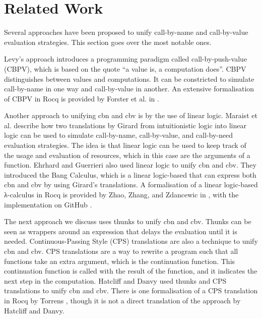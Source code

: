 \chapter{Related Work}\label{relatedwork}

Several approaches have been proposed to unify call-by-name and call-by-value evaluation strategies.
This section goes over the most notable ones.

Levy's approach \cite{levy2001thesis} introduces a programming paradigm called call-by-push-value (CBPV),
which is based on the quote ``a value is, a computation does''.
CBPV distinguishes between values and computations.
It can be constricted to simulate call-by-name in one way and call-by-value in another.
An extensive formalisation of CBPV in Rocq is provided by Forster et al. in \cite{ForsterSSS19}. 

Another approach to unifying \textsf{cbn} and \textsf{cbv} is by the use of linear logic. 
Maraist et al. \cite{MARAIST1999175} describe how two translations by Girard from intuitionistic logic into linear logic can be used to simulate call-by-name, call-by-value, and call-by-need evaluation strategies.
The idea is that linear logic can be used to keep track of the usage and evaluation of resources, which in this case are the arguments of a function.
Ehrhard and Guerrieri \cite{EhrhardGuerrieri2016} also used linear logic to unify \textsf{cbn} and \textsf{cbv}.
They introduced the Bang Calculus, which is a linear logic-based \lc that can express both \textsf{cbn} and \textsf{cbv} by using Girard's translations.
A formalisation of a linear logic-based λ-calculus in Rocq is provided by Zhao, Zhang, and Zdancewic in \cite{ZhaoZhangZdancewic2010},
with the implementation on GitHub \cite{ZdancewicLinearityRepo}.

The next approach we discuss uses thunks to unify \textsf{cbn} and \textsf{cbv}.
Thunks can be seen as wrappers around an expression that delays the evaluation until it is needed.
Continuous-Passing Style (CPS) translations are also a technique to unify \textsf{cbn} and \textsf{cbv}.
CPS translations are a way to rewrite a program such that all functions take an extra argument, which is the continuation function.
This continuation function is called with the result of the function, and it indicates the next step in the computation.
Hatcliff and Danvy \cite{HATCLIFF_DANVY_1997} used thunks and CPS translations to unify \textsf{cbn} and \textsf{cbv}.
There is one formalisation of a CPS translation in Rocq by Torrens \cite{torrens2024cpsrepo}, though it is not a direct translation of the approach by Hatcliff and Danvy.

